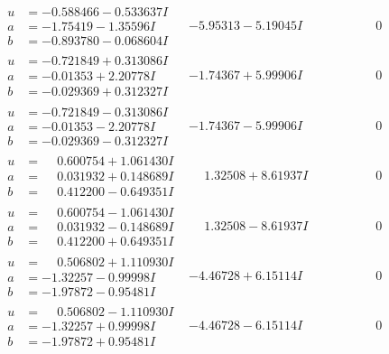 \documentclass[1p]{elsarticle_modified}
\theoremstyle{definition}
\begin{document}
$$\begin{array}{c|c|c}
\begin{aligned}
u &= -0.588466 - 0.533637 I \\
a &= -1.75419 - 1.35596 I \\
b &= -0.893780 - 0.068604 I\end{aligned}
 & -5.95313 - 5.19045 I & \phantom{-0.000000 } 0 \\ \hline\begin{aligned}
u &= -0.721849 + 0.313086 I \\
a &= -0.01353 + 2.20778 I \\
b &= -0.029369 + 0.312327 I\end{aligned}
 & -1.74367 + 5.99906 I & \phantom{-0.000000 } 0 \\ \hline\begin{aligned}
u &= -0.721849 - 0.313086 I \\
a &= -0.01353 - 2.20778 I \\
b &= -0.029369 - 0.312327 I\end{aligned}
 & -1.74367 - 5.99906 I & \phantom{-0.000000 } 0 \\ \hline\begin{aligned}
u &= \phantom{-}0.600754 + 1.061430 I \\
a &= \phantom{-}0.031932 + 0.148689 I \\
b &= \phantom{-}0.412200 - 0.649351 I\end{aligned}
 & \phantom{-}1.32508 + 8.61937 I & \phantom{-0.000000 } 0 \\ \hline\begin{aligned}
u &= \phantom{-}0.600754 - 1.061430 I \\
a &= \phantom{-}0.031932 - 0.148689 I \\
b &= \phantom{-}0.412200 + 0.649351 I\end{aligned}
 & \phantom{-}1.32508 - 8.61937 I & \phantom{-0.000000 } 0 \\ \hline\begin{aligned}
u &= \phantom{-}0.506802 + 1.110930 I \\
a &= -1.32257 - 0.99998 I \\
b &= -1.97872 - 0.95481 I\end{aligned}
 & -4.46728 + 6.15114 I & \phantom{-0.000000 } 0 \\ \hline\begin{aligned}
u &= \phantom{-}0.506802 - 1.110930 I \\
a &= -1.32257 + 0.99998 I \\
b &= -1.97872 + 0.95481 I\end{aligned}
 & -4.46728 - 6.15114 I & \phantom{-0.000000 } 0\\

\end{array}$$
\end{document}
